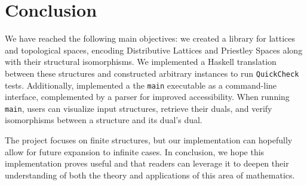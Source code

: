 
\section{Conclusion}\label{sec:Conclusion}
We have reached the following main objectives: we created a library for lattices and topological spaces, encoding Distributive Lattices and Priestley Spaces along with their structural isomorphisms. We implemented a Haskell translation between these structures and constructed arbitrary instances to run \texttt{QuickCheck} tests. Additionally, implemented a the \texttt{main} executable as a command-line interface, complemented by a parser for improved accessibility. When running \texttt{main}, users can visualize input structures, retrieve their duals, and verify isomorphisms between a structure and its dual’s dual.

The project focuses on finite structures, but our implementation can hopefully allow for future expansion to infinite cases. In conclusion, we hope this implementation proves useful and that readers can leverage it to deepen their understanding of both the theory and applications of this area of mathematics.
